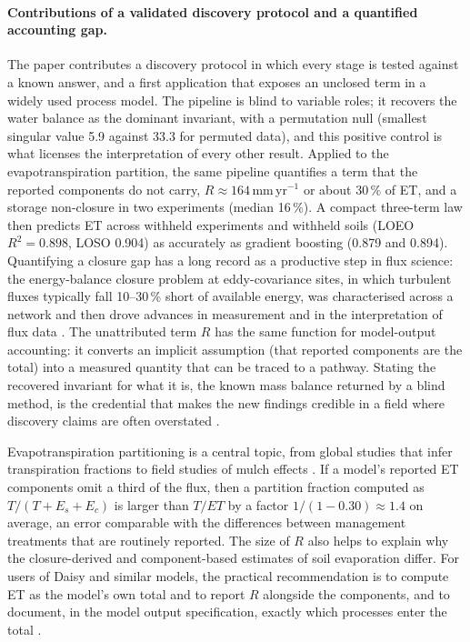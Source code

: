 \paragraph{Contributions of a validated discovery protocol and a quantified accounting gap.}
The paper contributes a discovery protocol in which every stage is tested against a known answer, and a first application that exposes an unclosed term in a widely used process model. The pipeline is blind to variable roles; it recovers the water balance as the dominant invariant, with a permutation null (smallest singular value 5.9 against 33.3 for permuted data), and this positive control is what licenses the interpretation of every other result. Applied to the evapotranspiration partition, the same pipeline quantifies a term that the reported components do not carry, $R\approx164$\,mm\,yr$^{-1}$ or about 30\,\% of ET, and a storage non-closure in two experiments (median 16\,\%). A compact three-term law then predicts ET across withheld experiments and withheld soils (LOEO $R^2=0.898$, LOSO 0.904) as accurately as gradient boosting (0.879 and 0.894). Quantifying a closure gap has a long record as a productive step in flux science: the energy-balance closure problem at eddy-covariance sites, in which turbulent fluxes typically fall 10--30\,\% short of available energy, was characterised across a network and then drove advances in measurement and in the interpretation of flux data \citep{Wilson2002,Foken2008}. The unattributed term $R$ has the same function for model-output accounting: it converts an implicit assumption (that reported components are the total) into a measured quantity that can be traced to a pathway. Stating the recovered invariant for what it is, the known mass balance returned by a blind method, is the credential that makes the new findings credible in a field where discovery claims are often overstated \citep{Rudin2019,Nearing2021}.

Evapotranspiration partitioning is a central topic, from global studies that infer transpiration fractions \citep{Jasechko2013,Schlesinger2014} to field studies of mulch effects \citep{BalwinderSingh2011}. If a model's reported ET components omit a third of the flux, then a partition fraction computed as $T/(T+E_s+E_c)$ is larger than $T/\mathit{ET}$ by a factor $1/(1-0.30)\approx1.4$ on average, an error comparable with the differences between management treatments that are routinely reported. The size of $R$ also helps to explain why the closure-derived and component-based estimates of soil evaporation differ. For users of Daisy and similar models, the practical recommendation is to compute ET as the model's own total and to report $R$ alongside the components, and to document, in the model output specification, exactly which processes enter the total \citep{Holbak2026}.

